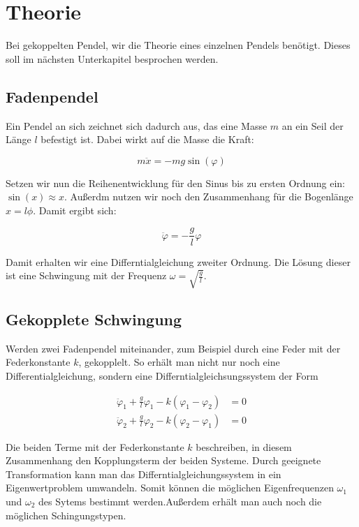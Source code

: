 \section{Theorie}

Bei gekoppelten Pendel, wir die Theorie eines einzelnen Pendels benötigt.
Dieses soll im nächsten Unterkapitel besprochen werden.

\subsection{Fadenpendel}

Ein Pendel an sich zeichnet sich dadurch aus, das eine Masse $m$ an ein Seil der Länge $l$ befestigt ist.
Dabei wirkt auf die Masse die Kraft:

 \begin{equation*}
 m\ddot{x}=-mg\sin(\varphi)
\end{equation*}

Setzen wir nun die Reihenentwicklung für den Sinus
bis zu ersten Ordnung ein: $\sin(x)\approx x$.
Außerdm nutzen wir noch den Zusammenhang 
für die Bogenlänge $x=l\phi$.
Damit ergibt sich:

\begin{equation*}
\ddot{\varphi}=-\frac{g}{l}\varphi
\end{equation*}

Damit erhalten wir eine Differntialgleichung zweiter Ordnung.
Die Lösung dieser ist eine Schwingung mit der Frequenz 
$\omega=\sqrt{\frac{g}{l}}$.

\subsection{Gekopplete Schwingung}

Werden zwei Fadenpendel miteinander, zum Beispiel durch eine Feder mit der Federkonstante $k$, 
gekopplelt. So erhält man nicht nur noch eine Differentialgleichung, sondern eine Differntialgleichsungssystem der Form

\begin{align*}
\ddot{\varphi}_1+\frac{g}{l}\varphi_1-k(\varphi_1-\varphi_2)&=0\\
\ddot{\varphi}_2+\frac{g}{l}\varphi_2-k(\varphi_2-\varphi_1)&=0
\end{align*}

Die beiden Terme mit der Federkonstante $k$ beschreiben, in
diesem Zusammenhang den Kopplungsterm der beiden Systeme.
Durch geeignete Transformation kann man das Differntialgleichungssystem in ein Eigenwertproblem umwandeln.
Somit können die möglichen Eigenfrequenzen $\omega_1$ und $\omega_2$ des Sytems bestimmt werden.Außerdem erhält man auch noch die möglichen Schingungstypen.


